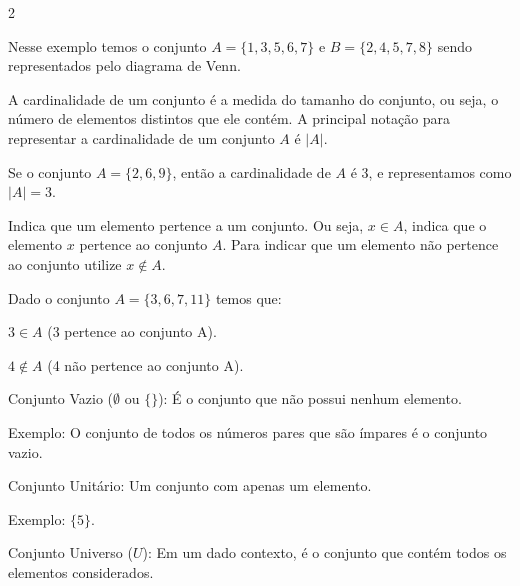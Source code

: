 \documentclass[12pt]{article}
\begin{document}
\begin{multicols}{2}
\begin{center}
\end{center}

Nesse exemplo temos o conjunto $A=\{1, 3, 5, 6, 7\}$ e $B=\{2, 4, 5, 7, 8\}$ sendo representados pelo diagrama de Venn.


A cardinalidade de um conjunto é a medida do tamanho do conjunto, ou seja, o número de elementos distintos que ele contém. A principal notação para representar a cardinalidade de um conjunto $A$ é $|A|$.


Se o conjunto $A = \{2, 6, 9\}$, então a cardinalidade de $A$ é $3$, e representamos como $|A| = 3$.


Indica que um elemento pertence a um conjunto. Ou seja, $x \in A$, indica que o elemento $x$ pertence ao conjunto $A$. Para indicar que um elemento não pertence ao conjunto utilize $x \notin A$.


Dado o conjunto $A = \{3, 6, 7, 11\}$ temos que:

$3 \in A$ (3 pertence ao conjunto A).

$4 \notin A$ (4 não pertence ao conjunto A).


Conjunto Vazio ($\emptyset$ ou $\{\}$): É o conjunto que não possui nenhum elemento.

\hspace{1cm}Exemplo: O conjunto de todos os números pares que são ímpares é o conjunto vazio.
 
Conjunto Unitário: Um conjunto com apenas um elemento.

\hspace{1cm}Exemplo: $\{5\}$.
     
Conjunto Universo ($U$): Em um dado contexto, é o conjunto que contém todos os elementos considerados.
 

\end{multicols}
\end{document}
